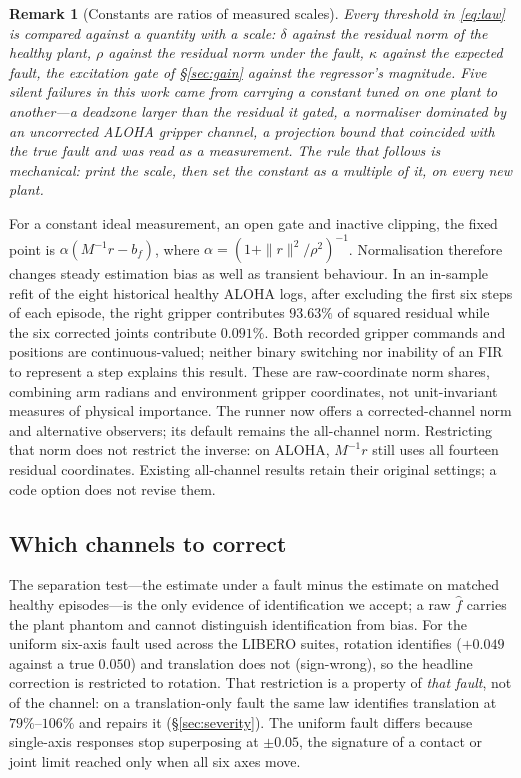 \documentclass{article}
\newtheorem{remark}{Remark}
\newcommand{\fhat}{\hat{f}}
\begin{document}
\begin{remark}[Constants are ratios of measured scales]
\label{rem:scale}
Every threshold in \eqref{eq:law} is compared against a quantity with a scale: $\delta$
against the residual norm of the healthy plant, $\rho$ against the residual norm under the
fault, $\kappa$ against the expected fault, the excitation gate of \S\ref{sec:gain} against
the regressor's magnitude. Five silent failures in this work came from carrying a constant
tuned on one plant to another---a deadzone larger than the residual it gated, a normaliser
dominated by an uncorrected ALOHA gripper channel, a projection bound that coincided with the true
fault and was read as a measurement. The rule that follows is mechanical: print the scale,
then set the constant as a multiple of it, on every new plant.
\end{remark}

For a constant ideal measurement, an open gate and inactive clipping, the fixed point is
$\alpha(M^{-1}r-b_f)$, where $\alpha=(1+\|r\|^2/\rho^2)^{-1}$. Normalisation therefore changes
steady estimation bias as well as transient behaviour. In an in-sample refit of the eight
historical healthy ALOHA logs, after excluding the first six steps of each episode, the right gripper contributes
$93.63\%$ of squared residual while the six corrected joints contribute $0.091\%$. Both recorded gripper commands and positions are continuous-valued;
neither binary switching nor inability of an FIR to represent a step explains this result.
These are raw-coordinate norm shares, combining arm radians and environment gripper
coordinates, not unit-invariant measures of physical importance.
The runner now offers a corrected-channel norm and alternative observers; its default
remains the all-channel norm. Restricting that norm does not restrict the inverse: on ALOHA,
$M^{-1}r$ still uses all fourteen residual coordinates. Existing all-channel results retain their original settings; a code option does not revise them.

\subsection{Which channels to correct}
\label{sec:channels}

The separation test---the estimate under a fault minus the estimate on matched healthy
episodes---is the only evidence of identification we accept; a raw $\fhat$ carries the plant
phantom and cannot distinguish identification from bias. For the uniform six-axis fault
used across the LIBERO suites, rotation identifies ($+0.049$ against a true $0.050$) and
translation does not (sign-wrong), so the headline correction is restricted to rotation.
That restriction is a property of \emph{that fault}, not of the channel: on a translation-only
fault the same law identifies translation at $79\%$--$106\%$ and repairs it
(\S\ref{sec:severity}). The uniform fault differs because single-axis responses stop superposing at
$\pm0.05$, the signature of a contact or joint limit reached only when all six axes move.
\end{document}
